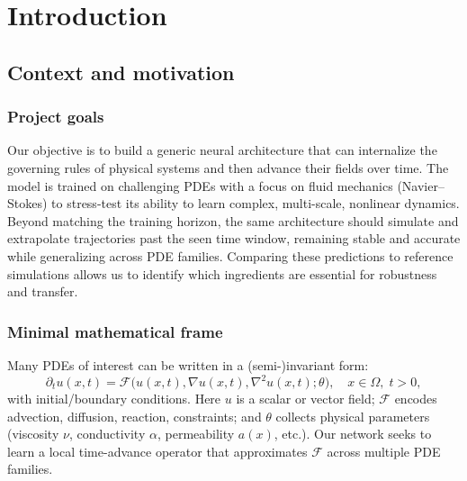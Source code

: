 \chapter{Introduction}
\section{Context and motivation}

\subsection{Project goals}
Our objective is to build a generic neural architecture that can internalize the governing rules of physical systems and then advance their fields over time. The model is trained on challenging PDEs with a focus on fluid mechanics (Navier--Stokes) to stress-test its ability to learn complex, multi-scale, nonlinear dynamics. Beyond matching the training horizon, the same architecture should simulate and extrapolate trajectories past the seen time window, remaining stable and accurate while generalizing across PDE families. Comparing these predictions to reference simulations allows us to identify which ingredients are essential for robustness and transfer.

\subsection{Minimal mathematical frame}
Many PDEs of interest can be written in a (semi-)invariant form:
\begin{equation}
	\partial_t u(x,t) = \mathcal{F}\big(u(x,t), \nabla u(x,t), \nabla^2 u(x,t); \theta\big), \quad x \in \Omega,\; t>0,
\end{equation}
with initial/boundary conditions. Here $u$ is a scalar or vector field; $\mathcal{F}$ encodes advection, diffusion, reaction, constraints; and $\theta$ collects physical parameters (viscosity $\nu$, conductivity $\alpha$, permeability $a(x)$, etc.). Our network seeks to learn a local time-advance operator that approximates $\mathcal{F}$ across multiple PDE families.


